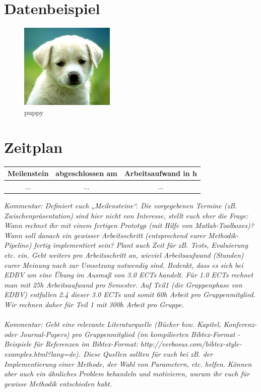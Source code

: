 \documentclass[deutsch]{scrartcl}
\begin{document}
\section{Datenbeispiel}
\begin{figure}[h!]
 \centering
 \includegraphics[width=0.4\textwidth]{img.jpg}
 \caption{puppy}
 \label{fig:img}
\end{figure}
\section{Zeitplan}
\begin{table}[h!]
	\centering
		\begin{tabular}{|c|c|c|}
		\hline
		Meilenstein & abgeschlossen am & Arbeitsaufwand in h\\
		\hline
		...&... &...\\
		\hline
		\end{tabular}
\end{table}
\textit{Kommentar: Definiert euch „Meilensteine“. Die vorgegebenen Termine (zB. Zwischenpräsentation) sind hier nicht von Interesse, stellt euch eher die Frage: Wann rechnet ihr mit einem fertigen Prototyp (mit Hilfe von Matlab-Toolboxes)? Wann soll danach ein gewisser Arbeitsschritt (entsprechend eurer Methodik-Pipeline) fertig implementiert sein? Plant auch Zeit für zB. Tests, Evaluierung etc. ein.
Gebt weiters pro Arbeitsschritt an, wieviel Arbeitsaufwand (Stunden) eurer Meinung nach zur Umsetzung notwendig sind. Bedenkt, dass es sich bei EDBV um eine Übung im Ausmaß von 3.0 ECTs handelt. Für 1.0 ECTs rechnet man mit 25h Arbeitsaufwand pro Semester. Auf Teil1 (die Gruppenphase von EDBV) entfallen 2.4 dieser 3.0 ECTs und somit 60h Arbeit pro Gruppenmitglied. Wir rechnen daher für Teil 1 mit 300h Arbeit pro Gruppe.
}\\
\\
\textit{Kommentar: Gebt eine relevante Literaturquelle (Bücher bzw. Kapitel, Konferenz- oder Journal-Papers) pro Gruppenmitglied (im kompilierten Bibtex-Format - Beispiele für Referenzen im Bibtex-Format: http://verbosus.com/bibtex-style-examples.html?lang=de). Diese Quellen sollten für euch bei zB. der Implementierung einer Methode, der Wahl von Parametern, etc. helfen. Können aber auch ein ähnliches Problem behandeln und motivieren, warum ihr euch für gewisse Methodik entschieden habt.}

\nocite{*}

\end{document}
